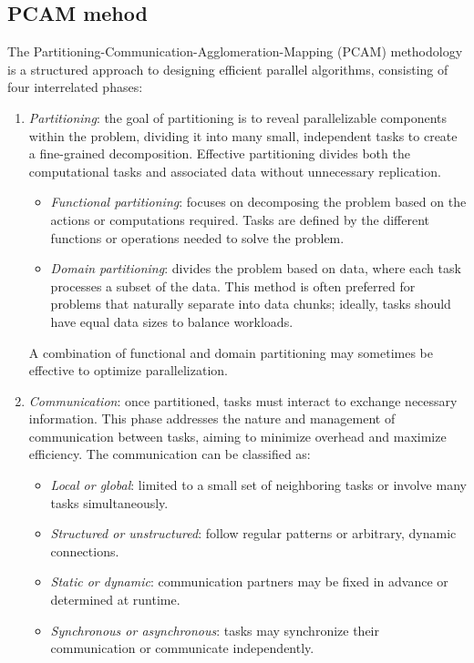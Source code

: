\subsection{PCAM mehod}
The Partitioning-Communication-Agglomeration-Mapping (PCAM) methodology is a structured approach to designing efficient parallel algorithms, consisting of four interrelated phases:
\begin{enumerate}
    \item \textit{Partitioning}: the goal of partitioning is to reveal parallelizable components within the problem, dividing it into many small, independent tasks to create a fine-grained decomposition. 
        Effective partitioning divides both the computational tasks and associated data without unnecessary replication.
        \begin{itemize}
            \item \textit{Functional partitioning}: focuses on decomposing the problem based on the actions or computations required. 
                Tasks are defined by the different functions or operations needed to solve the problem.
            \item \textit{Domain partitioning}: divides the problem based on data, where each task processes a subset of the data. 
                This method is often preferred for problems that naturally separate into data chunks; ideally, tasks should have equal data sizes to balance workloads.
        \end{itemize}
        A combination of functional and domain partitioning may sometimes be effective to optimize parallelization.
    \item \textit{Communication}: once partitioned, tasks must interact to exchange necessary information. 
        This phase addresses the nature and management of communication between tasks, aiming to minimize overhead and maximize efficiency.        
        The communication can be classified as: 
        \begin{itemize}
            \item \textit{Local or global}: limited to a small set of neighboring tasks or involve many tasks simultaneously. 
            \item \textit{Structured or unstructured}: follow regular patterns or arbitrary, dynamic connections. 
            \item \textit{Static or dynamic}: communication partners may be fixed in advance or determined at runtime.
            \item \textit{Synchronous or asynchronous}: tasks may synchronize their communication or communicate independently. 

\end{itemize}
\end{enumerate}
